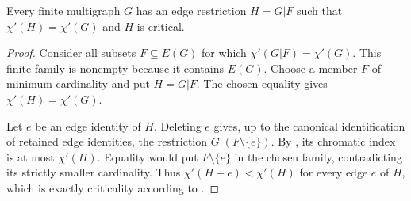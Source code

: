 \begin{lemma}
Every finite multigraph $G$ has an edge restriction $H=G|F$ such that
$\chi'(H)=\chi'(G)$ and $H$ is critical.
\end{lemma}
\begin{proof}
Consider all subsets $F\subseteq E(G)$ for which
$\chi'(G|F)=\chi'(G)$.  This finite family is nonempty because it contains
$E(G)$.  Choose a member $F$ of minimum cardinality and put $H=G|F$.
The chosen equality gives $\chi'(H)=\chi'(G)$.

Let $e$ be an edge identity of $H$.  Deleting $e$ gives, up to the canonical
identification of retained edge identities, the restriction
$G|(F\setminus\{e\})$.  By , its chromatic
index is at most $\chi'(H)$.  Equality would put
$F\setminus\{e\}$ in the chosen family, contradicting its strictly smaller
cardinality.  Thus $\chi'(H-e)<\chi'(H)$ for every edge $e$ of $H$, which is
exactly criticality according to .
\end{proof}

